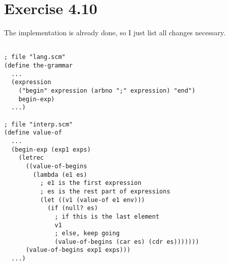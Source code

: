 \section*{Exercise 4.10}

The implementation is already done,
so I just list all changes necessary.

\begin{center}
\begin{lstlisting}[mathescape]

; file "lang.scm"
(define the-grammar
  ...
  (expression
    ("begin" expression (arbno ";" expression) "end")
    begin-exp)
  ...)

; file "interp.scm"
(define value-of
  ...
  (begin-exp (exp1 exps)
    (letrec 
      ((value-of-begins
        (lambda (e1 es)
          ; e1 is the first expression
          ; es is the rest part of expressions
          (let ((v1 (value-of e1 env)))
            (if (null? es)
              ; if this is the last element
              v1
              ; else, keep going
              (value-of-begins (car es) (cdr es)))))))
      (value-of-begins exp1 exps)))
  ...)
\end{lstlisting}
\end{center}
